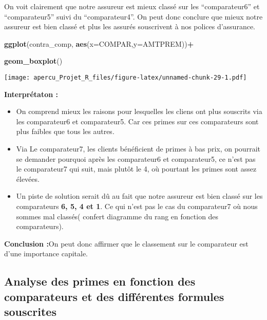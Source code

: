 \documentclass[
]{article}
\newenvironment{Shaded}{\begin{snugshade}}{\end{snugshade}}
\newcommand{\DataTypeTok}[1]{\textcolor[rgb]{0.13,0.29,0.53}{#1}}
\newcommand{\KeywordTok}[1]{\textcolor[rgb]{0.13,0.29,0.53}{\textbf{#1}}}
\newcommand{\NormalTok}[1]{#1}
\newcommand{\OperatorTok}[1]{\textcolor[rgb]{0.81,0.36,0.00}{\textbf{#1}}}
\begin{document}
On voit clairement que notre assureur est mieux classé sur les
``comparateur6'' et ``comparateur5'' suivi du ``comparateur4''. On peut
donc conclure que mieux notre assureur est bien classé et plus les
assurés souscrivent à nos polices d'assurance.

\begin{Shaded}
\begin{Highlighting}[]
\KeywordTok{ggplot}\NormalTok{(contra_comp, }\KeywordTok{aes}\NormalTok{(}\DataTypeTok{x=}\NormalTok{COMPAR,}\DataTypeTok{y=}\NormalTok{AMTPREM))}\OperatorTok{+}

\KeywordTok{geom_boxplot}\NormalTok{()}
\end{Highlighting}
\end{Shaded}

\texttt{[image: apercu\_Projet\_R\_files/figure-latex/unnamed-chunk-29-1.pdf]}

\textbf{Interprétaton :}

\begin{itemize}
\item
  On comprend mieux les raisons pour lesquelles les cliens ont plus
  souscrits via les comparateur6 et comparateur5. Car ces primes sur ces
  comparateurs sont plus faibles que tous les autres.
\item
  Via Le comparateur7, les clients bénéficient de primes à bas prix, on
  pourrait se demander pourquoi après les comparateur6 et comparateur5,
  ce n'est pas le comparateur7 qui suit, mais plutôt le 4, où pourtant
  les primes sont assez élevées.
\item
  Un piste de solution serait dû au fait que notre assureur est bien
  classé sur les comparateurs \textbf{6, 5, 4 et 1}. Ce qui n'est pas le
  cas du comparateur7 où nous sommes mal classés( confert diagramme du
  rang en fonction des comparateurs).
\end{itemize}

\textbf{Conclusion :}On peut donc affirmer que le classement sur le
comparateur est d'une importance capitale.

\hypertarget{analyse-des-primes-en-fonction-des-comparateurs-et-des-diffuxe9rentes-formules-souscrites}{%
\subsection{Analyse des primes en fonction des comparateurs et des
différentes formules
souscrites}\label{analyse-des-primes-en-fonction-des-comparateurs-et-des-diffuxe9rentes-formules-souscrites}}
\end{document}

